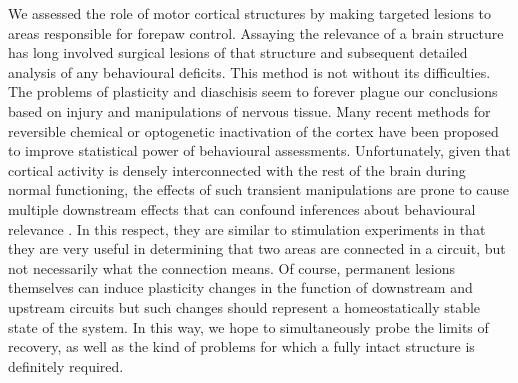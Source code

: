 We assessed the role of motor cortical structures by making targeted lesions to areas responsible for forepaw control. Assaying the relevance of a brain structure has long involved surgical lesions of that structure and subsequent detailed analysis of any behavioural deficits. This method is not without its difficulties. The problems of plasticity and diaschisis seem to forever plague our conclusions based on injury and manipulations of nervous tissue. Many recent methods for reversible chemical or optogenetic inactivation of the cortex have been proposed to improve statistical power of behavioural assessments. Unfortunately, given that cortical activity is densely interconnected with the rest of the brain during normal functioning, the effects of such transient manipulations are prone to cause multiple downstream effects that can confound inferences about behavioural relevance \cite{Otchy2015}. In this respect, they are similar to stimulation experiments in that they are very useful in determining that two areas are connected in a circuit, but not necessarily what the connection means. Of course, permanent lesions themselves can induce plasticity changes in the function of downstream and upstream circuits but such changes should represent a homeostatically stable state of the system. In this way, we hope to simultaneously probe the limits of recovery, as well as the kind of problems for which a fully intact structure is definitely required.
